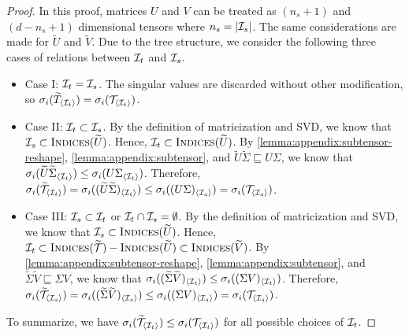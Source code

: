 \begin{proof}
%
In this proof, matrices $U$ and $V$ can be treated as $(n_s + 1)$ and $(d - n_s + 1)$ dimensional tensors where $n_s = |\mathcal{I}_s|$. The same considerations are made for $\widetilde{U}$ and $\widetilde{V}$. Due to the tree structure, we consider the following three cases of relations between $\mathcal{I}_t$ and $\mathcal{I}_s$.

\begin{itemize}
    \item Case I: $\mathcal{I}_t = \mathcal{I}_s$. The singular values are discarded without other modification, so $\sigma_i(\widetilde{T}_{\langle\mathcal{I}_t\rangle}) = \sigma_i(\mathcal{T}_{\langle\mathcal{I}_t\rangle})$.
    
    \item Case II: $\mathcal{I}_t \subset \mathcal{I}_s$. 
    By the definition of matricization and SVD, we know that $\mathcal{I}_s \subset \textsc{Indices}(\widetilde{U})$. Hence, $\mathcal{I}_t \subset \textsc{Indices}(\widetilde{U})$.
    By \cref{lemma:appendix:subtensor-reshape}, \cref{lemma:appendix:subtensor}, and $\widetilde{U}\widetilde{\Sigma} \sqsubseteq U \Sigma$, we know that $\sigma_i(\widetilde{U}\widetilde{\Sigma}_{\langle \mathcal{I}_t \rangle}) \leq \sigma_i(U \Sigma_{\langle \mathcal{I}_t \rangle})$.
    Therefore,
    $\sigma_i(\widetilde{\mathcal{T}}_{\langle \mathcal{I}_t \rangle}) = \sigma_i((\widetilde{U}\widetilde{\Sigma})_{\langle \mathcal{I}_t \rangle}) \leq \sigma_i((U\Sigma)_{\langle \mathcal{I}_s \rangle}) = \sigma_i(\mathcal{T}_{\langle \mathcal{I}_s \rangle})$.
    
    \item Case III: $\mathcal{I}_s \subset \mathcal{I}_t$ or $\mathcal{I}_t \cap \mathcal{I}_s = \emptyset$. By the definition of matricization and SVD, we know that $\mathcal{I}_s \subset \textsc{Indices}(\widetilde{U})$. Hence, $\mathcal{I}_t \subset \textsc{Indices}(\widetilde{\mathcal{T}}) - \textsc{Indices}(\widetilde{U}) \subset \textsc{Indices}(\widetilde{V})$. By \cref{lemma:appendix:subtensor-reshape}, \cref{lemma:appendix:subtensor}, and $\widetilde{\Sigma}\widetilde{V} \sqsubseteq \Sigma V$, we know that $\sigma_i((\widetilde{\Sigma}\widetilde{V})_{\langle \mathcal{I}_t \rangle}) \leq \sigma_i((\Sigma V)_{\langle \mathcal{I}_t \rangle})$.
    Therefore,
    $\sigma_i(\widetilde{\mathcal{T}}_{\langle \mathcal{I}_s \rangle}) = \sigma_i((\widetilde{\Sigma}\widetilde{V})_{\langle \mathcal{I}_s \rangle}) \leq \sigma_i((\Sigma V)_{\langle \mathcal{I}_s \rangle}) = \sigma_i(\mathcal{T}_{\langle \mathcal{I}_s \rangle})$.
\end{itemize}

To summarize, we have $\sigma_i(\widetilde{\mathcal{T}}_{\langle \mathcal{I}_t \rangle}) \leq \sigma_i(\mathcal{T}_{\langle\mathcal{I}_t\rangle})$ for all possible choices of $\mathcal{I}_t$.
\end{proof}

